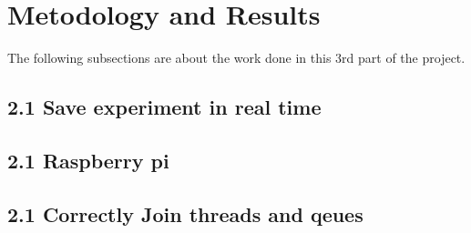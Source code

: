 \section{Metodology and Results}

    The following subsections are about the work done in this 3rd part of the project.


\subsection*{2.1 Save experiment in real time}


\subsection*{2.1 Raspberry pi}


\subsection*{2.1 Correctly Join threads and qeues}
